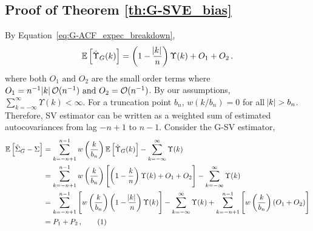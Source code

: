\documentclass[12pt]{article}
\newcommand{\Var}{\text{Var}}
\newcommand\numberthis{\addtocounter{equation}{1}\tag{\theequation}}
\theoremstyle{remark}
\begin{document}
\subsection{Proof of Theorem \ref{th:G-SVE_bias}}
\label{appendix:gsv_bias}

By Equation~\ref{eq:G-ACF_expec_breakdown},
%
%
\[
\mathbb{E} \left[\hat{\Upsilon}_{G}(k) \right] = \left(1 - \dfrac{\abs{k}}{n}\right)\Upsilon(k) + O_1 + O_2    \,.
\]
%
where both $O_1 \textrm{ and } O_2$ are the small order terms where $O_1 = n^{-1}\abs{k} \mathcal{O}(n^{-1}) \text{ and } O_2 = \mathcal{O}(n^{-1})$. By our assumptions, $\sum_{k=-\infty}^{\infty}\Upsilon(k) < \infty$.  
For a truncation point $b_n$, $w(k/b_n)=0$ for all $\abs{k} > b_n$. Therefore, SV estimator can be written as a weighted sum of estimated autocovariances from lag $-n+1$ to $n-1$. Consider the G-SV estimator,
\begin{align*}
 \mathbb{E} \left[\hat{\Sigma}_{G} - \Sigma \right] & = \sum_{k=-n+1}^{n-1} w\left(\dfrac{k}{b_n}\right)\mathbb{E} \left[\hat{\Upsilon}_{G}(k) \right] - \sum_{k=-\infty}^{\infty}\Upsilon(k)\\
    &= \sum_{k=-n+1}^{n-1}  w\left(\dfrac{k}{b_n}\right)\left[\left(1-\dfrac{k}{n}\right)\Upsilon(k) + O_1 + O_2 \right]  - \sum_{k=-\infty}^{\infty}\Upsilon(k)\\
    &= \sum_{k=-n+1}^{n-1} \left[ w\left(\dfrac{k}{b_n}\right)\left(1-\dfrac{\abs{k}}{n}\right)\Upsilon(k)\right]  - \sum_{k=-\infty}^{\infty}\Upsilon(k) + \sum_{k=-n+1}^{n-1}\left[  w\left(\dfrac{k}{b_n}\right)  (O_1 + O_2) \right] \\ 
    & = P_1 + P_2\,, \numberthis \label{eq:bias_gsve}
\end{align*}
\end{document}
